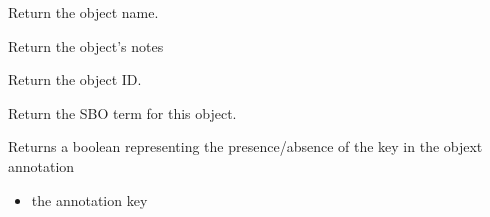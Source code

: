 \documentclass[letterpaper,10pt,english]{sphinxmanual}
\begin{document}
\begin{fulllineitems}
\begin{fulllineitems}
\label{\detokenize{modules_doc:cbmpy.CBModel.Fbase.getName}}
\pysigstartsignatures
{}
\pysigstopsignatures
\sphinxAtStartPar
Return the object name.

\end{fulllineitems}


\begin{fulllineitems}
\label{\detokenize{modules_doc:cbmpy.CBModel.Fbase.getNotes}}
\pysigstartsignatures
{}
\pysigstopsignatures
\sphinxAtStartPar
Return the object’s notes

\end{fulllineitems}


\begin{fulllineitems}
\label{\detokenize{modules_doc:cbmpy.CBModel.Fbase.getPid}}
\pysigstartsignatures
{}
\pysigstopsignatures
\sphinxAtStartPar
Return the object ID.

\end{fulllineitems}


\begin{fulllineitems}
\label{\detokenize{modules_doc:cbmpy.CBModel.Fbase.getSBOterm}}
\pysigstartsignatures
{}
\pysigstopsignatures
\sphinxAtStartPar
Return the SBO term for this object.

\end{fulllineitems}


\begin{fulllineitems}
\label{\detokenize{modules_doc:cbmpy.CBModel.Fbase.hasAnnotation}}
\pysigstartsignatures
{}
\pysigstopsignatures
\sphinxAtStartPar
Returns a boolean representing the presence/absence of the key in the objext annotation
\begin{itemize}
\item {} 
\sphinxAtStartPar
{} the annotation key


\end{itemize}
\end{fulllineitems}
\end{fulllineitems}
\end{document}
